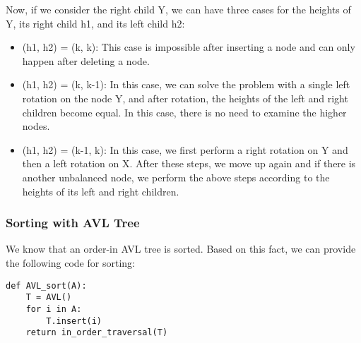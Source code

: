 \documentclass[a4paper, 11pt, oneside]{book} %
\begin{document}
Now, if we consider the right child Y, we can have three cases for the heights of Y, its right child h1, and its left child h2:

\begin{itemize}
    \item (h1, h2) = (k, k): This case is impossible after inserting a node and can only happen after deleting a node.
    \item (h1, h2) = (k, k-1): In this case, we can solve the problem with a single left rotation on the node Y, and after rotation, the heights of the left and right children become equal. In this case, there is no need to examine the higher nodes.
    \item (h1, h2) = (k-1, k): In this case, we first perform a right rotation on Y and then a left rotation on X. After these steps, we move up again and if there is another unbalanced node, we perform the above steps according to the heights of its left and right children.
\end{itemize}

\subsubsection{Sorting with AVL Tree}
We know that an order-in AVL tree is sorted. Based on this fact, we can provide the following code for sorting:
\\
\begin{lstlisting}
def AVL_sort(A):
    T = AVL()
    for i in A:
        T.insert(i)
    return in_order_traversal(T)
\end{lstlisting}
\end{document}
